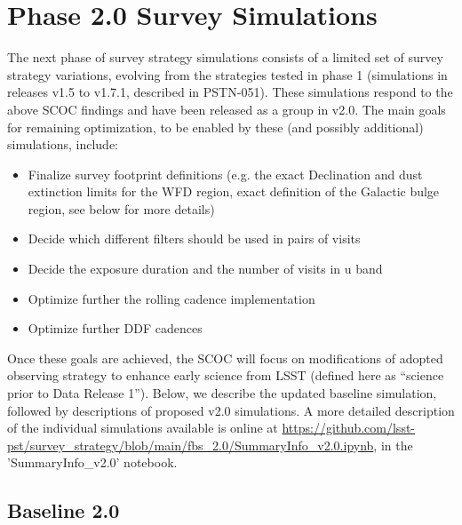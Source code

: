 \section{Phase 2.0 Survey Simulations}

The next phase of survey strategy simulations consists of a limited set of survey strategy variations, evolving from the strategies tested in phase 1 (simulations in releases v1.5 to v1.7.1, described in PSTN-051). These simulations respond to the above SCOC findings and have been released as a group in v2.0. The main goals for remaining optimization, to be enabled by these (and possibly additional) simulations,  include:
\begin{itemize}
\item{Finalize survey footprint definitions (e.g. the exact Declination and dust extinction 
            limits for  the WFD region, exact definition of the Galactic bulge region, see below for 
            more details)}
\item{Decide which different filters should be used in pairs of visits}
\item{Decide the exposure duration and the number of visits in u band }
\item{Optimize further the rolling cadence implementation }
\item{Optimize further DDF cadences }
\end{itemize}

Once these goals are achieved, the SCOC will focus on modifications of adopted observing strategy to enhance early science from LSST (defined here as ``science prior to Data Release 1''). Below, we describe the updated baseline simulation, followed by descriptions of proposed v2.0 simulations. A more detailed description of the individual simulations available is online at \url{https://github.com/lsst-pst/survey_strategy/blob/main/fbs_2.0/SummaryInfo_v2.0.ipynb}, in the 'SummaryInfo_v2.0' notebook. 

\subsection{Baseline 2.0}

